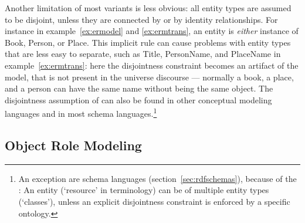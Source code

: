Another limitation of most  variants is less obvious: all entity
types are assumed to be disjoint, unless they are connected by  or
by identity relationships.  For instance in example~\ref{ex:ermodel} and
\ref{ex:ermtrans}, an entity is {\em either} instance of {\ormtext Book},
{\ormtext Person}, or {\ormtext Place}. This implicit rule can cause problems with
entity types that are less easy to separate, such as {\ormtext Title}, {\ormtext PersonName},
and {\ormtext PlaceName} in example~\ref{ex:ermtrans}: here the disjointness
constraint becomes an artifact of the model, that is not present in the
universe discourse --- normally a book, a place, and a person can have the same
name without being the same object. The disjointness assumption of 
can also be found in other conceptual modeling languages and in most schema
languages.\footnote{An exception are  schema languages 
(section~\ref{sec:rdfschemas}), because of the
: An  entity (`resource' in
 terminology) can be of multiple entity types (`classes'), unless 
an explicit disjointness constraint is enforced by a specific
ontology.} 



\subsection{Object Role Modeling}
\label{sec:orm}





